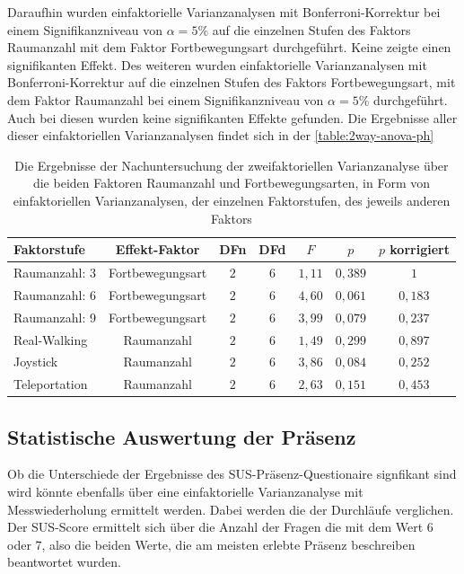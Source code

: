                     Daraufhin wurden einfaktorielle Varianzanalysen mit Bonferroni-Korrektur bei einem Signifikanzniveau von $\alpha = 5\%$ auf die einzelnen Stufen des Faktors Raumanzahl mit dem Faktor Fortbewegungsart durchgeführt. Keine zeigte einen signifikanten Effekt. Des weiteren wurden einfaktorielle Varianzanalysen mit Bonferroni-Korrektur auf die einzelnen Stufen des Faktors Fortbewegungsart, mit dem Faktor Raumanzahl bei einem Signifikanzniveau von $\alpha = 5\%$ durchgeführt. Auch bei diesen wurden keine signifikanten Effekte gefunden. Die Ergebnisse aller dieser einfaktoriellen Varianzanalysen findet sich in der \autoref{table:2way-anova-ph}

        \begin{table}[!h]
            \renewcommand\arraystretch{1.2}
            \centering
\begin{tabular}{lcccccc} \toprule
Faktorstufe    & Effekt-Faktor  & DFn & DFd & $F$    & $p$      & $p$ korrigiert  \\ \midrule
Raumanzahl: 3  &  Fortbewegungsart & $2$ & $6$ & $1,11$ & $0,389$ & $1$  \\
Raumanzahl: 6  &  Fortbewegungsart & $2$ & $6$ & $4,60$ & $0,061$ & $0,183$  \\
Raumanzahl: 9  &  Fortbewegungsart & $2$ & $6$ & $3,99$ & $0,079$ & $0,237$  \\
Real-Walking   &  Raumanzahl       & $2$ & $6$ & $1,49$ & $0,299$ & $0,897 $\\
Joystick       &  Raumanzahl       & $2$ & $6$ & $3,86$ & $0,084$ & $0,252 $\\
Teleportation  &  Raumanzahl       & $2$ & $6$ & $2,63$ & $0,151$ & $0,453 $\\
\end{tabular}
\caption{Die Ergebnisse der Nachuntersuchung der zweifaktoriellen Varianzanalyse über die beiden Faktoren Raumanzahl und Fortbewegungsarten, in Form von einfaktoriellen Varianzanalysen, der einzelnen Faktorstufen, des jeweils anderen Faktors}\label{table:2way-anova-ph}
\end{table}

                \subsection{Statistische Auswertung der Präsenz}
                    Ob die Unterschiede der Ergebnisse des SUS-Präsenz-Questionaire signfikant sind wird könnte ebenfalls über eine einfaktorielle Varianzanalyse mit Messwiederholung ermittelt werden. Dabei werden die  der Durchläufe verglichen. Der SUS-Score ermittelt sich über die Anzahl der Fragen die mit dem Wert $6$ oder $7$, also die beiden Werte, die am meisten erlebte Präsenz beschreiben beantwortet wurden.

